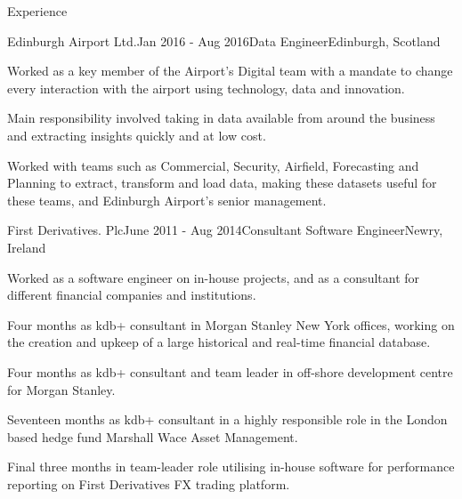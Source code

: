 \documentclass{resume} %
\begin{document}
\begin{rSection}{Experience}
  \begin{rSubsection}{Edinburgh Airport Ltd.}{Jan 2016 - Aug 2016}{Data Engineer}{Edinburgh, Scotland}
    \item Worked as a key member of the Airport's Digital team with a mandate to change every interaction with the airport using technology, data and innovation.
    \item Main responsibility involved taking in data available from around the business and extracting insights quickly and at low cost.
    \item Worked with teams such as Commercial, Security, Airfield, Forecasting and Planning to extract, transform and load data, making these datasets useful for these teams, and Edinburgh Airport’s senior management.
  \end{rSubsection}

  \begin{rSubsection}{First Derivatives. Plc}{June 2011 - Aug 2014}{Consultant Software Engineer}{Newry, Ireland}
    \item Worked as a software engineer on in-house projects, and as a consultant for different financial companies and institutions.
    \item Four months as kdb+ consultant in Morgan Stanley New York offices, working on the creation and upkeep of a large historical and real-time financial database.
    \item Four months as kdb+ consultant and team leader in off-shore development centre for Morgan Stanley.
    \item Seventeen months as kdb+ consultant in a highly responsible role in the London based hedge fund Marshall Wace Asset Management.
    \item Final three months in team-leader role utilising in-house software for performance reporting on First Derivatives FX trading platform.
  \end{rSubsection}




\end{rSection}
\end{document}
